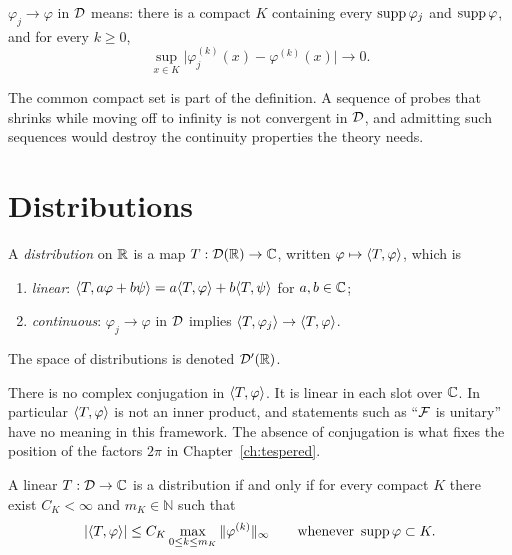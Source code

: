 \begin{definition}[convergence in $\D$]
$\varphi_{j}\to\varphi$ in $\D$ means: there is a compact $K$ containing every $\operatorname{supp}\varphi_{j}$ and
$\operatorname{supp}\varphi$, and for every $k\ge0$,
\begin{equation}
\sup_{x\in K}\big|\varphi_{j}^{(k)}(x)-\varphi^{(k)}(x)\big|\longrightarrow0 .
\end{equation}
\end{definition}

The common compact set is part of the definition. A sequence of probes that shrinks while moving off
to infinity is not convergent in $\D$, and admitting such sequences would destroy the continuity
properties the theory needs.

\section{Distributions}

\begin{definition}\label{def:distribution}
A \emph{distribution} on $\mathbb{R}$ is a map $T:\mathcal{D}(\mathbb{R})\to\mathbb{C}$, written $\varphi\mapsto\langle T,\varphi\rangle$,
which is
\begin{enumerate}
\item \emph{linear}: $\langle T,a\varphi+b\psi\rangle=a\langle T,\varphi\rangle+b\langle T,\psi\rangle$ for $a,b\in\mathbb{C}$;
\item \emph{continuous}: $\varphi_{j}\to\varphi$ in $\D$ implies $\langle T,\varphi_{j}\rangle\to\langle T,\varphi\rangle$.
\end{enumerate}
The space of distributions is denoted $\mathcal{D}'(\mathbb{R})$.
\end{definition}

\begin{remark}
There is no complex conjugation in $\langle T,\varphi\rangle$. It is linear in each slot over $\mathbb{C}$. In
particular $\langle T,\varphi\rangle$ is not an inner product, and statements such as ``$\mathcal{F}$ is unitary'' have
no meaning in this framework. The absence of conjugation is what fixes the position of the factors
$2\pi$ in Chapter~\ref{ch:tespered}.
\end{remark}

\begin{proposition}\label{prop:localest}
A linear $T:\mathcal{D}\to\mathbb{C}$ is a distribution if and only if for every compact $K$ there exist $C_{K}<\infty$
and $m_{K}\in\mathbb{N}$ such that
\begin{equation}
|\langle T,\varphi\rangle|\le C_{K}\max_{0\le k\le m_{K}}\|\varphi^{(k)}\|_{\infty}
\qquad\text{whenever }\operatorname{supp}\varphi\subset K .
\label{eq:localest}
\end{equation}
\end{proposition}

